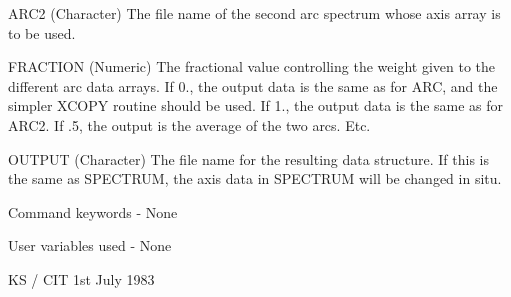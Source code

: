 \begin{description}
\begin{terminalv}
 ARC2        (Character) The file name of the second arc
             spectrum whose axis array is to be used.

 FRACTION    (Numeric) The fractional value controlling the
             weight given to the different arc data arrays.
             If 0., the output data is the same as for ARC,
             and the simpler XCOPY routine should be used.
             If 1., the output data is the same as for ARC2.
             If .5, the output is the average of the two arcs.
             Etc.

 OUTPUT      (Character) The file name for the resulting data
             structure.  If this is the same as SPECTRUM, the
             axis data in SPECTRUM will be changed in situ.

 Command keywords - None

 User variables used - None

                                         KS / CIT 1st July 1983
\end{terminalv}
\end{description}
